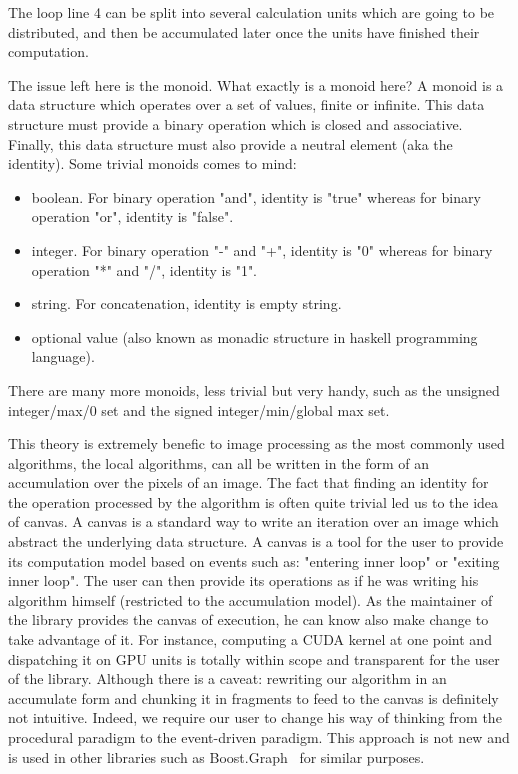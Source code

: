 The loop line 4 can be split into several calculation units which are going to be distributed, and then be accumulated
later once the units have finished their computation.

The issue left here is the monoid. What exactly is a monoid here? A monoid is a data structure which operates over a set
of values, finite or infinite. This data structure must provide a binary operation which is closed and associative.
Finally, this data structure must also provide a neutral element (aka the identity). Some trivial monoids comes to mind:
\begin{itemize}
  \item boolean. For binary operation "and", identity is "true" whereas for binary operation "or", identity is "false".
  \item integer. For binary operation "-" and "+", identity is "0" whereas for binary operation "*" and "/", identity is
        "1".
  \item string. For concatenation, identity is empty string.
  \item optional value (also known as monadic structure in haskell programming language).
\end{itemize}
There are many more monoids, less trivial but very handy, such as the unsigned integer/max/0 set and the signed
integer/min/global max set.

This theory is extremely benefic to image processing as the most commonly used algorithms, the local algorithms, can all
be written in the form of an accumulation over the pixels of an image. The fact that finding an identity for the
operation processed by the algorithm is often quite trivial led us to the idea of canvas. A canvas is a standard way to
write an iteration over an image which abstract the underlying data structure. A canvas is a tool for the user to
provide its computation model based on events such as: "entering inner loop" or "exiting inner loop". The user can then
provide its operations as if he was writing his algorithm himself (restricted to the accumulation model). As the
maintainer of the library provides the canvas of execution, he can know also make change to take advantage of it. For
instance, computing a CUDA kernel at one point and dispatching it on GPU units is totally within scope and transparent
for the user of the library. Although there is a caveat: rewriting our algorithm in an accumulate form and chunking it
in fragments to feed to the canvas is definitely not intuitive. Indeed, we require our user to change his way of
thinking from the procedural paradigm to the event-driven paradigm. This approach is not new and is used in other
libraries such as Boost.Graph~\cite{siek.2001.boostgraph} for similar purposes.

